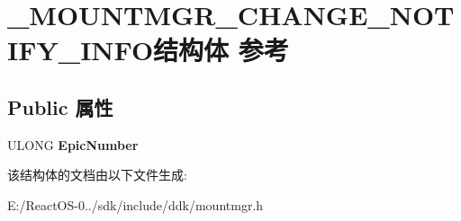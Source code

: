 \hypertarget{struct___m_o_u_n_t_m_g_r___c_h_a_n_g_e___n_o_t_i_f_y___i_n_f_o}{}\section{\+\_\+\+M\+O\+U\+N\+T\+M\+G\+R\+\_\+\+C\+H\+A\+N\+G\+E\+\_\+\+N\+O\+T\+I\+F\+Y\+\_\+\+I\+N\+F\+O结构体 参考}
\label{struct___m_o_u_n_t_m_g_r___c_h_a_n_g_e___n_o_t_i_f_y___i_n_f_o}
\subsection*{Public 属性}
\begin{DoxyCompactItemize}
\item 
\mbox{\label{struct___m_o_u_n_t_m_g_r___c_h_a_n_g_e___n_o_t_i_f_y___i_n_f_o_a2154f531a695fea31b01e26187e26366}} 
U\+L\+O\+NG {\bfseries Epic\+Number}
\end{DoxyCompactItemize}


该结构体的文档由以下文件生成\+:\begin{DoxyCompactItemize}
\item 
E\+:/\+React\+O\+S-\/0../sdk/include/ddk/mountmgr.\+h\end{DoxyCompactItemize}
